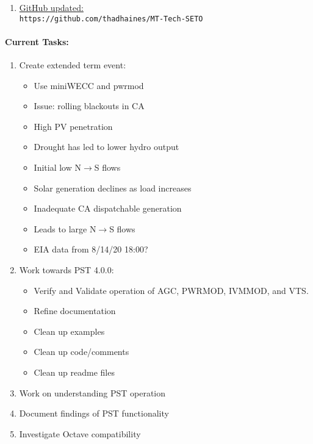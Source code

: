 \documentclass[12pt]{article}
\begin{document}
\begin{multicols}{2}
\begin{enumerate}
		\item \href{https://github.com/thadhaines/MT-Tech-SETO}{GitHub updated:}\\
	{\footnotesize \verb|https://github.com/thadhaines/MT-Tech-SETO| }\\
	\end{enumerate}

\paragraph{Current Tasks:}
	\begin{enumerate}
		\itemsep 0em 
	\item Create extended term event:
	\begin{itemize}
			\footnotesize
			\itemsep0em
	\item Use miniWECC and pwrmod
	\item Issue: rolling blackouts in CA
	\item High PV penetration
	\item Drought has led to lower hydro output
	\item Initial low N$\longrightarrow$S flows
	\item Solar generation declines as load increases %
	\item Inadequate CA dispatchable generation %
	\item Leads to large N$\longrightarrow$S flows
	\item EIA data from 8/14/20 18:00? %
	\end{itemize}
		\item Work towards PST 4.0.0:
		\begin{itemize}
		\footnotesize
		\itemsep0em
		\item Verify and Validate operation of AGC, PWRMOD, IVMMOD, and VTS.
		\item Refine documentation	
		\item Clean up examples
		\item Clean up code/comments
		\item Clean up readme files
		\end{itemize}
		\item Work on understanding PST operation
		\item Document findings of PST functionality
		\item Investigate Octave compatibility
\end{enumerate}



\end{multicols}
\end{document}
